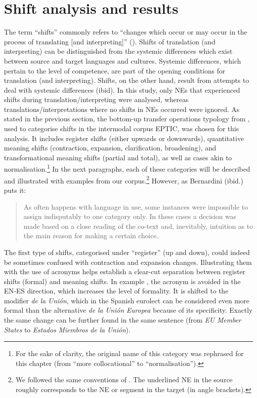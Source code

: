 \documentclass[output=paper]{langscibook}
\begin{document}
\section{Shift analysis and results}\label{sec:corpas:5}

The term “shifts” commonly refers to “changes which occur or may occur in the process of translating [and interpreting]” (\citealt[269]{BakkerEtAl2009}). Shifts of translation (and interpreting) can be distinguished from the systemic differences which exist between source and target languages and cultures. Systemic differences, which pertain to the level of competence, are part of the opening conditions for translation (and interpreting). Shifts, on the other hand, result from attempts to deal with systemic differences (ibid). In this study, only NEs that experienced shifts during translation/interpreting were analysed, whereas translations/interpretations where no shifts in NEs occurred were ignored. As stated in the previous section, the bottom-up transfer operations typology from \citet[140]{Bernardini2016}, used to categorise shifts in the intermodal corpus EPTIC, was chosen for this analysis. It includes register shifts (either upwards or downwards), quantitative meaning shifts (contraction, expansion, clarification, broadening), and transformational meaning shifts (partial and total), as well as cases akin to normalisation.\footnote{For the sake of clarity, the original name of this category was rephrased for this chapter (from “more collocational” to “normalisation”).} In the next paragraphs, each of these categories will be described and illustrated with examples from our corpus.\footnote{We followed the same conventions of \citet[140]{Bernardini2016}. The underlined NE in the source roughly corresponds to the NE or segment in the target (in angle brackets).} However, as Bernardini (ibid.) puts it:

\begin{quote}
As often happens with language in use, some instances were impossible to assign indisputably to one category only. In these cases a decision was made based on a close reading of the co-text and, inevitably, intuition as to the main reason for making a certain choice. \citep[140]{Bernardini2016} 
\end{quote}

The first type of shifts, categorised under “register” (up and down), could indeed be sometimes confused with contraction and expansion changes. Illustrating them with the use of acronyms helps establish a clear-cut separation between register shifts (formal) and meaning shifts. In example , the acronym is avoided in the EN-ES direction, which increases the level of formality. It is shifted to the modifier \textit{de la Unión}, which in the Spanish eurolect can be considered even more formal than the alternative \textit{de la Unión Europea} because of its specificity. Exactly the same change can be further found in the same sentence (from \textit{EU Member States} to \textit{Estados Miembros de la Unión}).
\end{document}
